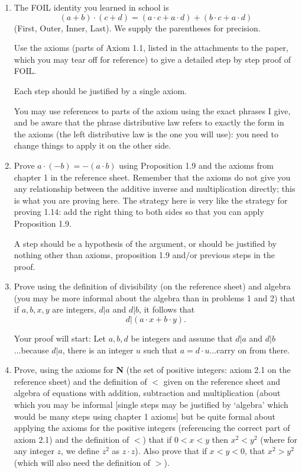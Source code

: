 \documentclass[12pt]{article}
\begin{document}
\begin{enumerate}

\item The FOIL identity you learned in school is $$(a+b)\cdot(c+d) = (a\cdot c + a \cdot d) + (b \cdot c + a \cdot d)$$ (First, Outer, Inner, Last).  We supply the parentheses for precision.  

Use the axioms (parts of Axiom 1.1, listed in the attachments to the paper, which you may tear off for reference) to give a detailed step by step proof of FOIL.  

Each step should be justified by a single axiom.  

You may use references to parts of the axiom using the exact phrases I give, and be aware that the phrase distributive law refers to exactly the form in the axioms (the left distributive law is the one you will use):  you need to change things to apply it on the other side.

\newpage

\item  Prove $a \cdot (-b) = -(a\cdot b)$ using Proposition 1.9 and the axioms from chapter 1 in the reference sheet.  Remember that the axioms do not give you any relationship between the additive inverse and multiplication directly;  this is what you are proving here.  The strategy here is very like the strategy for proving 1.14: add the right thing to both sides so that you can apply Proposition 1.9.

A step should be a hypothesis of the argument, or should be justified by nothing other than axioms, proposition 1.9 and/or previous steps in the proof.

\newpage

\item Prove using the definition of divisibility (on the reference sheet) and algebra (you may be more informal about the algebra than in problems 1 and  2) that if $a,b,x,y$ are integers, $d|a$ and $d|b$, it follows that $$d|(a\cdot x+b\cdot y).$$

Your proof will start:  Let $a,b,d$ be integers and assume that $d|a$ and $d|b$...because $d|a$, there is an integer $u$ such that $a=d\cdot u$...carry on from there.

\newpage

\item Prove, using the axioms for {\bf N} (the set of positive integers:  axiom 2.1 on the reference sheet) and the definition of $<$ given on the reference sheet and algebra of equations with addition, subtraction and multiplication (about which you may be informal [single steps may be justified by `algebra' which would be many steps using chapter 1 axioms] but be quite formal about applying the axioms for the positive integers (referencing the correct part of axiom 2.1) and the definition of $<$) that if $0<x<y$ then $x^2 < y^2$ (where for any integer $z$, we define
$z^2$ as $z \cdot z$).  Also prove that if $x<y<0$, that $x^2 > y^2$ (which will also need the definition of $>$).


\end{enumerate}
\end{document}

